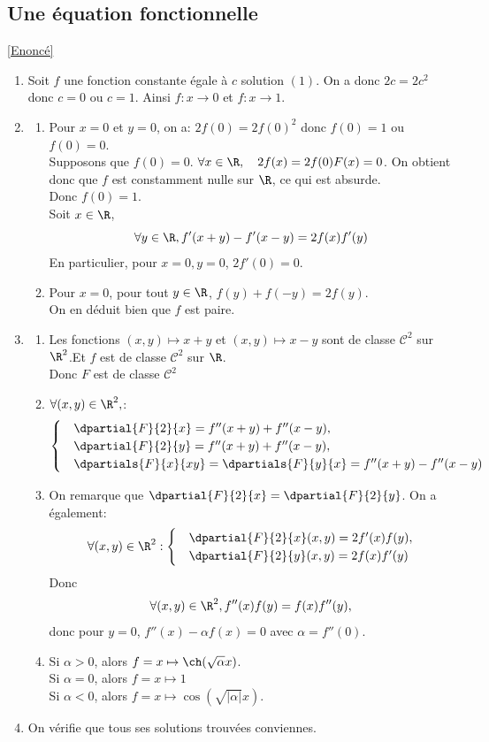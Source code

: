 \documentclass{book}
\begin{document}
	\subsection{Une équation fonctionnelle }
	\label{Une équation fonctionnelle corrigé}
	\textcolor{blue}{\hyperref[Une équation fonctionnelle]{[Enoncé]}}\\
	\begin{enumerate}
		\item Soit $f$ une fonction constante égale à $c$ solution $(1)$.
		On a donc $2c=2c^2$ donc $c=0$ ou $c=1$.
		Ainsi $f:x\to0$ et $f:x\to1$.
		\item 
		\begin{enumerate}[label=\alph*.]
			\item Pour $x=0$ et $y=0$, on a: $2f(0)=2f(0)^2$ donc $f(0)=1$ ou $f(0)=0$.
			\\Supposons que $f(0)=0$.
			$\forall x\in\R,\quad2f(x)=2f(0)F(x)=0$.
			On obtient donc que $f$ est constamment nulle sur $\R$, ce qui est absurde.
			\\Donc $f(0)=1$.
			\\ Soit $x\in\R$, 
			$$\forall y\in\R, f'(x+y)-f'(x-y)=2f(x)f'(y)$$
			En particulier, pour $x=0,y=0$, $2f'(0)=0.$
			\item Pour $x=0$, pour tout $y\in\R$, $f(y)+f(-y)=2f(y)$.
			\\On en déduit bien que $f$ est paire.
		\end{enumerate}
		\item 
		\begin{enumerate}[label=\alph*.]
			\item Les fonctions $(x,y)\mapsto x+y$ et $(x,y)\mapsto x-y$ sont de classe $\mathcal{C}^2$ sur $\R^2$.Et $f$ est de classe $\mathcal{C}^2$ sur $\R$.
			\\Donc $F$ est de classe $\mathcal{C}^2$
			\item $\forall (x,y)\in \R^2,$:
			$$\begin{cases}
				&\dpartial{F}{2}{x}=f''(x+y)+f''(x-y), \\
				&\dpartial{F}{2}{y}=f''(x+y)+f''(x-y),\\
				&\dpartials{F}{x}{xy}=\dpartials{F}{y}{x}=f''(x+y)-f''(x-y)
			\end{cases}$$
			\item On remarque que $\dpartial{F}{2}{x}=\dpartial{F}{2}{y}$.
			On a également: $$\forall(x,y)\in\R^2:\begin{cases}
				&\dpartial{F}{2}{x}(x,y)=2f'(x)f(y),\\
				&\dpartial{F}{2}{y}(x,y)=2f(x)f'(y)
			\end{cases}$$
			Donc $$\forall(x,y)\in\R^2, f''(x)f(y)=f(x)f''(y),$$
			donc pour $y=0$, $f''(x)-\alpha f(x)=0$ avec $\alpha=f''(0)$.
			\item Si $\alpha>0$, alors $f=x\mapsto \ch(\sqrt{\alpha}x)$.
			\\ Si $\alpha=0$, alors $f=x\mapsto 1$
			\\Si $\alpha<0$, alors $f=x\mapsto \cos(\sqrt{|\alpha|}x)$.
		\end{enumerate}
		\item On vérifie que tous ses solutions trouvées conviennes.
	\end{enumerate}
	
\end{document}

